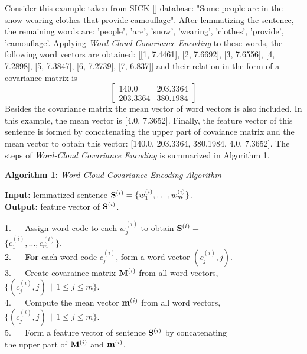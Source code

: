 \documentclass[11pt]{article}
\begin{document}
Consider this example taken from SICK \ref{} database:
"Some people are in the snow  wearing clothes that provide camouflage". After lemmatizing the sentence,
the remaining words are: 'people', 'are', 'snow', 'wearing', 'clothes', 'provide', 'camouflage'. Applying 
{\em Word-Cloud Covariance Encoding} to these words, the following word vectors are obtained:
[[1, 7.4461], [2, 7.6692], [3, 7.6556], [4, 7.2898], [5, 7.3847], [6, 7.2739], [7, 6.837]] and their
relation in the form of a covariance matrix is
\begin{equation}
\left [ \begin{array}{cc}
140.0 & 203.3364 \\
203.3364 & 380.1984
\end{array} \right ]
\end{equation}
Besides the covariance matrix the mean vector of word vectors is also included. In this example, the
mean vector is [4.0, 7.3652]. Finally, the feature vector of this sentence is formed by concatenating
the upper part of covaiance matrix and the mean vector  to obtain this vector:
[140.0, 203.3364, 380.1984, 4.0, 7.3652]. The steps of {\em Word-Cloud Covariance Encoding} is summarized in
Algorithm 1.

\noindent
{\bf Algorithm 1:} {\em Word-Cloud Covariance Encoding Algorithm} \\
{\small
{\bf Input: } lemmatized sentence ${\bf S}^{(i)} = \{w^{(i)}_{1}, \ldots, w^{(i)}_{m}\}$. \\
{\bf Output: } feature vector of ${\bf S}^{(i)}$.

\begin{tabbing}
1. ~~ \= Assign word code to each $w^{(i)}_{j}$ to obtain ${\bf S}^{(i)} =$ \\
      \> $\{c^{(i)}_{1}, \ldots, c^{(i)}_{m}\}$. \\
2. ~~ \> {\bf For} each word code $c^{(i)}_{j}$, form a word vector $(c^{(i)}_{j}, j)$. \\
3. ~~ \> Create covaraince matrix ${\bf M}^{(i)}$ from all word vectors, \\
      \> $\{(c^{(i)}_{j}, j) \:\: | \:\: 1 \leq j \leq m\}$. \\
4. ~~ \> Compute the mean vector ${\bf m}^{(i)}$ from all word vectors, \\
      \> $\{(c^{(i)}_{j}, j) \:\: | \:\: 1 \leq j \leq m\}$. \\
5. ~~ \> Form a feature vector of sentence ${\bf S}^{(i)}$ by concatenating \\
      \> the upper part of ${\bf M}^{(i)}$ and ${\bf m}^{(i)}$. \\
\end{tabbing}
} 
\end{document}
